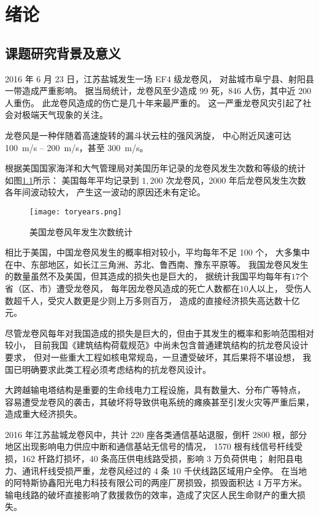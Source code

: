 \graphicspath{{figures/intro/}}

\chapter{绪论}

\section{课题研究背景及意义}

2016 年 6 月 23 日，江苏盐城发生一场 EF4 级龙卷风，
对盐城市阜宁县、射阳县一带造成严重影响。
据当局统计，龙卷风至少造成 99 死，846 人伤，其中近 200 人重伤。
此龙卷风造成的伤亡是几十年来最严重的\cite{wiki2016yancheng}。
这一严重龙卷风灾引起了社会对极端天气现象的关注。

龙卷风是一种伴随着高速旋转的漏斗状云柱的强风涡旋，
中心附近风速可达 \SI{100}{m/s} -- \SI{200}{m/s}，甚至 \SI{300}{m/s}。

根据美国国家海洋和大气管理局对美国历年记录的龙卷风发生次数和等级的统计
如图\ref{fig:tornado-years}所示\cite{noaa2017tornado}：
美国每年平均记录到 $1,200$ 次龙卷风，2000 年后龙卷风发生次数各年间波动较大，
产生这一波动的原因还未有定论。
\begin{figure}[!htbp]
    \centering
    \texttt{[image: toryears.png]}
    \caption{美国龙卷风年发生次数统计}
    \label{fig:tornado-years}
\end{figure}

相比于美国，中国龙卷风发生的概率相对较小，平均每年不足 100 个，
大多集中在中、东部地区，如长江三角洲、苏北、鲁西南、豫东平原等。
我国龙卷风发生的数量虽然不及美国，但其造成的损失也是巨大的，
据统计我国平均每年有$17$个省（区、市）遭受龙卷风，
每年因龙卷风造成的死亡人数都在$10$人以上，
受伤人数超千人，受灾人数更是少则上万多则百万，
造成的直接经济损失高达数十亿元\cite{liu2007chinese}。

尽管龙卷风每年对我国造成的损失是巨大的，但由于其发生的概率和影响范围相对较小，
目前我国《建筑结构荷载规范》中尚未包含普通建筑结构的抗龙卷风设计要求，
但对一些重大工程如核电常规岛，一旦遭受破坏，其后果将不堪设想，
我国已明确要求此类工程必须考虑结构的抗龙卷风设计。

大跨越输电塔结构是重要的生命线电力工程设施，具有数量大、分布广等特点，
容易遭受龙卷风的袭击，其破坏将导致供电系统的瘫痪甚至引发火灾等严重后果，造成重大经济损失。

2016 年江苏盐城龙卷风中，共计 220 座各类通信基站退服，倒杆 2800 根，部分地区出现影响电力供应中断和通信基站无信号的情况，
1570 根有线信号杆线受损，162 杆路灯损坏，40 条高压供电线路受损，影响 3 万负荷供电；
射阳县电力、通讯杆线受损严重，龙卷风经过的 4 条 10 千伏线路区域用户全停。
在当地的阿特斯协鑫阳光电力科技有限公司的两座厂房损毁，损毁面积达 4 万平方米\cite{thepaper2016yancheng}。
输电线路的破坏直接影响了救援救伤的效率，造成了灾区人民生命财产的重大损失。

